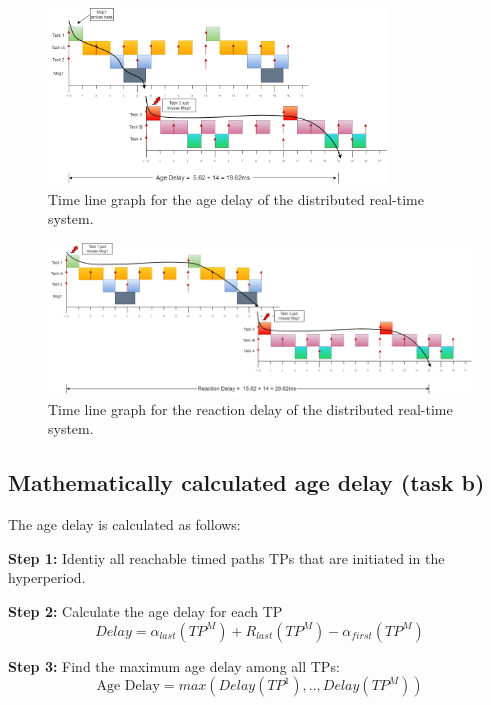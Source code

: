        \begin{figure}[H]
            \centering
            \includegraphics[width=0.8\textwidth]{images/AgeDelay.png}
            \caption{Time line graph for the age delay of the distributed real-time system.}
            \label{fig:agedelay}   
        \end{figure}

        \begin{figure}[H]
            \centering
            \includegraphics[width=1\textwidth]{images/ReactionDelay.png}
            \caption{Time line graph for the reaction delay of the distributed real-time system.}
            \label{fig:reactiondelay}
        \end{figure}


        \subsection*{Mathematically calculated age delay (task b)}
            The age delay is calculated as follows:

            \textbf{Step 1:} Identiy all reachable timed paths TPs that are initiated in the hyperperiod. 

            \textbf{Step 2:} Calculate the age delay for each TP
            $$Delay = \alpha_{last}(TP^M) + R_{last}(TP^M) - \alpha_{first}(TP^M)$$

            \textbf{Step 3:} Find the maximum age delay among all TPs: 
            $$\text{Age Delay} = max(Delay(TP^1),..,Delay(TP^M))$$


